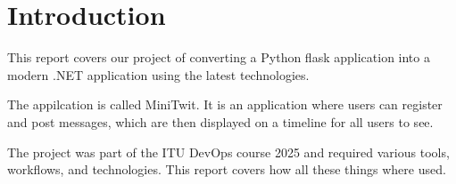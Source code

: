 \section{Introduction}
\label{ch:introduction}

This report covers our project of converting a Python flask application 
into a modern .NET application using the latest technologies.

The appilcation is called MiniTwit. 
It is an application where users can register and post messages, 
which are then displayed on a timeline for all users to see.

The project was part of the ITU DevOps course 2025 and required various tools, 
workflows, and technologies. This report covers how all these things where
used.

